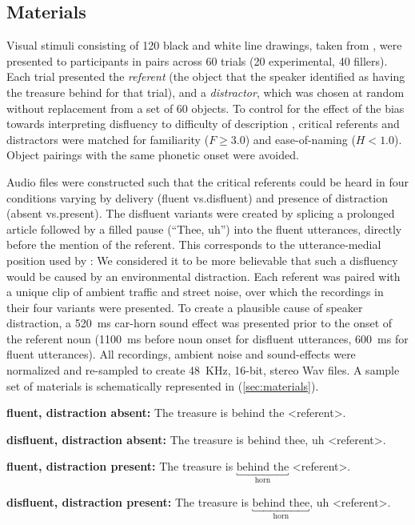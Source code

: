 \documentclass[a4paper,man,natbib]{apa6}
\newcommand*{\spex}[1]{``{#1}''} %
\begin{document}
\subsection{Materials}
Visual stimuli consisting of 120 black and white line drawings, taken from \citet{Snodgrass1980}, were presented to participants in pairs across 60 trials (20 experimental, 40 fillers). 
Each trial presented the \textit{referent} (the object that the speaker identified as having the treasure behind for that trial), and a \textit{distractor}, which was chosen at random without replacement from a set of 60 objects. 
To control for the effect of the bias towards interpreting disfluency to difficulty of description \citep{Arnold2007}, critical referents and distractors were matched for familiarity ($F \ge 3.0$) and ease-of-naming ($H <1.0$). 
Object pairings with the same phonetic onset were avoided. 

Audio files were constructed such that the critical referents could be heard in four conditions varying by delivery (fluent vs.\@ disfluent) and presence of distraction (absent vs.\@ present). 
The disfluent variants were created by splicing a prolonged article followed by a filled pause (\spex{Thee, uh}) into the fluent utterances, directly before the mention of the referent.
This corresponds to the utterance-medial position used by \citet{Loy2016}:
We considered it to be more believable that such a disfluency would be caused by an environmental distraction.
Each referent was paired with a unique clip of ambient traffic and street noise, over which the recordings in their four variants were presented.
To create a plausible cause of speaker distraction, a 520~ms car-horn sound effect was presented prior to the onset of the referent noun (1100~ms before noun onset for disfluent utterances, 600~ms for fluent utterances). 
All recordings, ambient noise and sound-effects were normalized and re-sampled to create 48~KHz, 16-bit, stereo Wav files.
A sample set of materials is schematically represented in (\ref{sec:materials}).

\begin{examples}\label{sec:materials}
\item \textbf{fluent, distraction absent:} The treasure is behind the \textless referent\textgreater .
\item \textbf{disfluent, distraction absent:} The treasure is behind thee, uh \textless referent\textgreater .
\item \textbf{fluent, distraction present:} The treasure is $\underbracket{\text{behind the}}_\text{horn}$ \textless referent\textgreater .
\item \textbf{disfluent, distraction present:} The treasure is $\underbracket{\text{behind thee}}_\text{horn}$, uh \textless referent\textgreater .
\end{examples}
\end{document}

